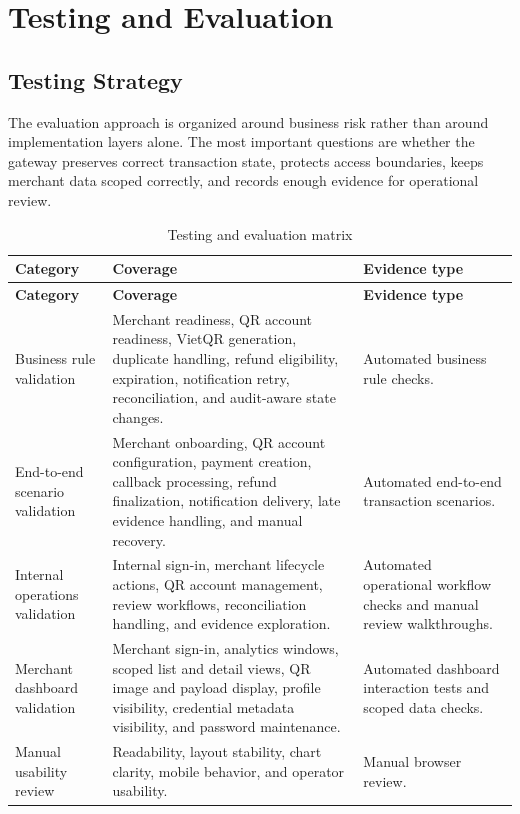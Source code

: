 \chapter{Testing and Evaluation}

\section{Testing Strategy}

The evaluation approach is organized around business risk rather than around
implementation layers alone. The most important questions are whether the
gateway preserves correct transaction state, protects access boundaries, keeps
merchant data scoped correctly, and records enough evidence for operational
review.

\begin{longtable}{L{0.22\textwidth}L{0.36\textwidth}L{0.32\textwidth}}
\caption{Testing and evaluation matrix}\\
\toprule
\textbf{Category} & \textbf{Coverage} & \textbf{Evidence type} \\
\midrule
\endfirsthead
\toprule
\textbf{Category} & \textbf{Coverage} & \textbf{Evidence type} \\
\midrule
\endhead
Business rule validation & Merchant readiness, QR account readiness, VietQR generation, duplicate handling, refund eligibility, expiration, notification retry, reconciliation, and audit-aware state changes. & Automated business rule checks. \\
\bodyrowrule
End-to-end scenario validation & Merchant onboarding, QR account configuration, payment creation, callback processing, refund finalization, notification delivery, late evidence handling, and manual recovery. & Automated end-to-end transaction scenarios. \\
\bodyrowrule
Internal operations validation & Internal sign-in, merchant lifecycle actions, QR account management, review workflows, reconciliation handling, and evidence exploration. & Automated operational workflow checks and manual review walkthroughs. \\
\bodyrowrule
Merchant dashboard validation & Merchant sign-in, analytics windows, scoped list and detail views, QR image and payload display, profile visibility, credential metadata visibility, and password maintenance. & Automated dashboard interaction tests and scoped data checks. \\
\bodyrowrule
Manual usability review & Readability, layout stability, chart clarity, mobile behavior, and operator usability. & Manual browser review. \\
\bottomrule
\end{longtable}

